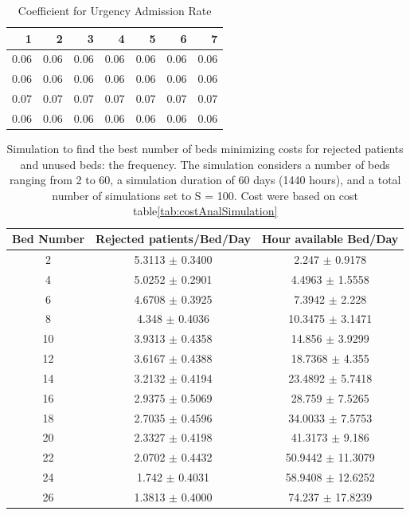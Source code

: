 \documentclass[12pt]{article}
\begin{document}
\begin{table}[H]
\captionsetup{skip=10pt}
\caption{Coefficient for Urgency Admission Rate}
\label{tab:urgencyCoefAdmRate}
\centering
\begin{tabular}{rrrrrrr}
\hline
1 & 2 & 3 & 4 & 5 & 6 & 7 \\
\hline
0.06 & 0.06 & 0.06 & 0.06 & 0.06 & 0.06 & 0.06 \\
0.06 & 0.06 & 0.06 & 0.06 & 0.06 & 0.06 & 0.06 \\
0.07 & 0.07 & 0.07 & 0.07 & 0.07 & 0.07 & 0.07 \\
0.06 & 0.06 & 0.06 & 0.06 & 0.06 & 0.06 & 0.06 \\
   \hline
\end{tabular}
\end{table}

\begin{table}[H]
\captionsetup{skip=10pt}
\centering
\caption{Simulation to find the best number of beds minimizing costs for rejected patients and unused beds: the frequency. The simulation considers a number of beds ranging from 2 to 60, a simulation duration of 60 days (1440 hours), and a total number of simulations set to S = 100. Cost were based on cost table\ref{tab:costAnalSimulation}}
\label{tab:bestFixBedSimulation}
\begin{tabular}{ccc}
\hline
Bed Number & Rejected patients/Bed/Day & Hour available Bed/Day \\
\hline
2 & 5.3113 $\pm$ 0.3400 & 2.247 $\pm$ 0.9178 \\
4 & 5.0252 $\pm$ 0.2901 & 4.4963 $\pm$ 1.5558 \\
6 & 4.6708 $\pm$ 0.3925 & 7.3942 $\pm$ 2.228 \\
8 & 4.348 $\pm$ 0.4036 & 10.3475 $\pm$ 3.1471 \\
10 & 3.9313 $\pm$ 0.4358 & 14.856 $\pm$ 3.9299 \\
12 & 3.6167 $\pm$ 0.4388 & 18.7368 $\pm$ 4.355 \\
14 & 3.2132 $\pm$ 0.4194 & 23.4892 $\pm$ 5.7418 \\
16 & 2.9375 $\pm$ 0.5069 & 28.759 $\pm$ 7.5265 \\
18 & 2.7035 $\pm$ 0.4596 & 34.0033 $\pm$ 7.5753 \\
20 & 2.3327 $\pm$ 0.4198 & 41.3173 $\pm$ 9.186 \\
22 & 2.0702 $\pm$ 0.4432 & 50.9442 $\pm$ 11.3079 \\
24 & 1.742 $\pm$ 0.4031 & 58.9408 $\pm$ 12.6252 \\
26 & 1.3813 $\pm$ 0.4000 & 74.237 $\pm$ 17.8239 \\

\end{tabular}
\end{table}
\end{document}
